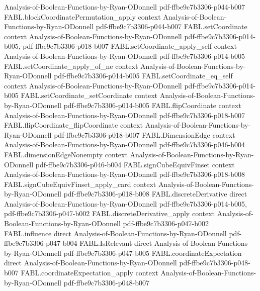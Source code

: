 \begin{theorem}
  {Analysis-of-Boolean-Functions-by-Ryan-ODonnell}
  {pdf-ffbe9c7b3306-p044-b007}
\proofstep
  {FABL.blockCoordinatePermutation_apply}
  {context}
  {Analysis-of-Boolean-Functions-by-Ryan-ODonnell}
  {pdf-ffbe9c7b3306-p044-b007}
\proofstep
  {FABL.setCoordinate}
  {context}
  {Analysis-of-Boolean-Functions-by-Ryan-ODonnell}
  {pdf-ffbe9c7b3306-p014-b005,
    pdf-ffbe9c7b3306-p018-b007}
\proofstep
  {FABL.setCoordinate_apply_self}
  {context}
  {Analysis-of-Boolean-Functions-by-Ryan-ODonnell}
  {pdf-ffbe9c7b3306-p014-b005}
\proofstep
  {FABL.setCoordinate_apply_of_ne}
  {context}
  {Analysis-of-Boolean-Functions-by-Ryan-ODonnell}
  {pdf-ffbe9c7b3306-p014-b005}
\proofstep
  {FABL.setCoordinate_eq_self}
  {context}
  {Analysis-of-Boolean-Functions-by-Ryan-ODonnell}
  {pdf-ffbe9c7b3306-p014-b005}
\proofstep
  {FABL.setCoordinate_setCoordinate}
  {context}
  {Analysis-of-Boolean-Functions-by-Ryan-ODonnell}
  {pdf-ffbe9c7b3306-p014-b005}
\proofstep
  {FABL.flipCoordinate}
  {context}
  {Analysis-of-Boolean-Functions-by-Ryan-ODonnell}
  {pdf-ffbe9c7b3306-p018-b007}
\proofstep
  {FABL.flipCoordinate_flipCoordinate}
  {context}
  {Analysis-of-Boolean-Functions-by-Ryan-ODonnell}
  {pdf-ffbe9c7b3306-p018-b007}
\proofstep
  {FABL.DimensionEdge}
  {context}
  {Analysis-of-Boolean-Functions-by-Ryan-ODonnell}
  {pdf-ffbe9c7b3306-p046-b004}
\proofstep
  {FABL.dimensionEdgeNonempty}
  {context}
  {Analysis-of-Boolean-Functions-by-Ryan-ODonnell}
  {pdf-ffbe9c7b3306-p046-b004}
\proofstep
  {FABL.signCubeEquivFinset}
  {context}
  {Analysis-of-Boolean-Functions-by-Ryan-ODonnell}
  {pdf-ffbe9c7b3306-p018-b008}
\proofstep
  {FABL.signCubeEquivFinset_apply_card}
  {context}
  {Analysis-of-Boolean-Functions-by-Ryan-ODonnell}
  {pdf-ffbe9c7b3306-p018-b008}
\proofstep
  {FABL.discreteDerivative}
  {direct}
  {Analysis-of-Boolean-Functions-by-Ryan-ODonnell}
  {pdf-ffbe9c7b3306-p014-b005,
    pdf-ffbe9c7b3306-p047-b002}
\proofstep
  {FABL.discreteDerivative_apply}
  {context}
  {Analysis-of-Boolean-Functions-by-Ryan-ODonnell}
  {pdf-ffbe9c7b3306-p047-b002}
\proofstep
  {FABL.influence}
  {direct}
  {Analysis-of-Boolean-Functions-by-Ryan-ODonnell}
  {pdf-ffbe9c7b3306-p047-b004}
\proofstep
  {FABL.IsRelevant}
  {direct}
  {Analysis-of-Boolean-Functions-by-Ryan-ODonnell}
  {pdf-ffbe9c7b3306-p047-b005}
\proofstep
  {FABL.coordinateExpectation}
  {direct}
  {Analysis-of-Boolean-Functions-by-Ryan-ODonnell}
  {pdf-ffbe9c7b3306-p048-b007}
\proofstep
  {FABL.coordinateExpectation_apply}
  {context}
  {Analysis-of-Boolean-Functions-by-Ryan-ODonnell}
  {pdf-ffbe9c7b3306-p048-b007}
\proofstep

\end{theorem}
